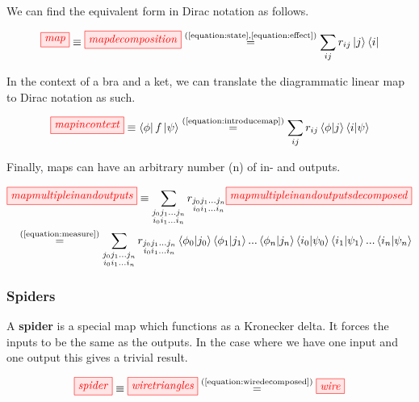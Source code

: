 \documentclass[]{article}
\newcommand{\equaltext}[1]{\ensuremath{\stackrel{\text{#1}}{=}}}
\begin{document}
We can find the equivalent form in Dirac notation as follows.

\begin{equation}
\label{equation:introducemap}
\tikzfig{map} \equiv \tikzfig{mapdecomposition} \equaltext{(\ref{equation:state},\ref{equation:effect})} \sum_{ij}r_{ij}\ket{j}\bra{i}
\end{equation}

In the context of a bra and a ket, we can translate the diagrammatic linear map to Dirac notation as such.

\begin{equation}
\tikzfig{mapincontext} \equiv \bra{\phi}f\ket{\psi} \equaltext{(\ref{equation:introducemap})} \sum_{ij}r_{ij} \bra{\phi}\ket{j}\bra{i}\ket{\psi}
\end{equation}

Finally, maps can have an arbitrary number (n) of in- and outputs.

\begin{equation} 
\begin{aligned}
	\tikzfig{mapmultipleinandoutputs} \equiv \sum\limits_{\substack{j_0 j_1 ... j_n \\ i_0 i_1 ... i_n}} r_{\substack{j_0 j_1 ... j_n \\ i_0 i_1 ... i_n}} \tikzfig{mapmultipleinandoutputsdecomposed} \\ \equaltext{(\ref{equation:measure})} \sum\limits_{\substack{j_0 j_1 ... j_n \\ i_0 i_1 ... i_n}} r_{\substack{j_0 j_1 ... j_n \\ i_0 i_1 ... i_n}} \bra{\phi_0}\ket{j_0} \bra{\phi_1}\ket{j_1} ... \bra{\phi_n}\ket{j_n} \bra{i_0}\ket{\psi_0}\bra{i_1}\ket{\psi_1}...\bra{i_n}\ket{\psi_n}
\end{aligned}
\end{equation}

\subsubsection{Spiders}
\label{spiders}

A \textbf{spider} is a special map which functions as a Kronecker delta. It forces the inputs to be the same as the outputs. In the case where we have one input and one output this gives a trivial result.

\begin{equation}
\label{equation:boringspider}
\tikzfig{spider} \equiv \tikzfig{wiretriangles} \equaltext{(\ref{equation:wiredecomposed})} \tikzfig{wire}
\end{equation}
\end{document}
